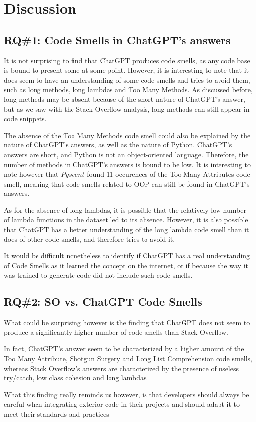 \section{Discussion}
\label{sec:discussion}

\subsection{RQ\#1: Code Smells in ChatGPT's answers}
\label{sec:discussion-rq1}
It is not surprising to find that ChatGPT produces code smells, as any code base is bound to present some at some point. However, it is interesting to note that it does seem to have an understanding of some code smells and tries to avoid them, such as long methods, long lambdas and Too Many Methods. As discussed before, long methods may be absent because of the short nature of ChatGPT's answer, but as we saw with the Stack Overflow analysis, long methods can still appear in code snippets.

The absence of the Too Many Methods code smell could also be explained by the nature of ChatGPT's answers, as well as the nature of Python. ChatGPT's answers are short, and Python is not an object-oriented language. Therefore, the number of methods in ChatGPT's answers is bound to be low. It is interesting to note however that $Pyscent$ found 11 occurences of the Too Many Attributes code smell, meaning that code smells related to OOP can still be found in ChatGPT's answers.

As for the absence of long lambdas, it is possible that the relatively low number of lambda functions in the dataset led to its absence. However, it is also possible that ChatGPT has a better understanding of the long lambda code smell than it does of other code smells, and therefore tries to avoid it.

It would be difficult nonetheless to identify if ChatGPT has a real understanding of Code Smells as it learned the concept on the internet, or if because the way it was trained to generate code did not include such code smells. \\

\subsection{RQ\#2: SO vs. ChatGPT Code Smells}
\label{sec:discussion-rq2}
What could be surprising however is the finding that ChatGPT does not seem to produce a significantly higher number of code smells than Stack Overflow.

In fact, ChatGPT's answer seem to be characterized by a higher amount of the Too Many Attribute, Shotgun Surgery and Long List Comprehension code smells, whereas Stack Overflow's answers are characterized by the presence of useless try/catch, low class cohesion and long lambdas.

What this finding really reminds us however, is that developers should always be careful when integrating exterior code in their projects and should adapt it to meet their standards and practices. \\